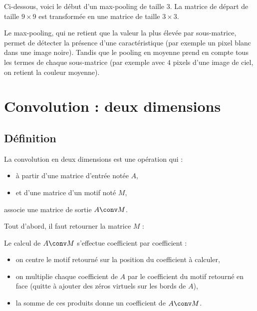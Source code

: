 \documentclass[11pt,class=report,crop=false]{standalone}
\begin{document}
Ci-dessous, voici le début d'un max-pooling de taille $3$. La matrice de départ de taille $9\times 9$ est transformée en une matrice de taille $3\times 3$.
  
  

Le max-pooling, qui ne retient que la valeur la plus élevée par sous-matrice, permet de détecter la présence d'une caractéristique (par exemple un pixel blanc dans une image noire). Tandis que le pooling en moyenne prend en compte tous les termes de chaque sous-matrice (par exemple avec $4$ pixels d'une image de ciel, on retient la couleur moyenne). 




\section{Convolution : deux dimensions}

\subsection{Définition}

La convolution en deux dimensions est une opération qui :
\begin{itemize}
  \item à partir d'une matrice d'entrée notée $A$,
  \item et d'une matrice d'un motif noté $M$,
\end{itemize}
associe une matrice de sortie $A \conv M$.

Tout d'abord, il faut retourner la matrice $M$ : 



Le calcul de  $A \conv M$ s'effectue coefficient par coefficient :
\begin{itemize}
  \item on centre le motif retourné sur la position du coefficient à calculer,
  \item on multiplie chaque coefficient de $A$ par le coefficient du motif retourné en face (quitte à ajouter des zéros virtuels sur les bords de $A$),
  \item la somme de ces produits donne un coefficient de $A \conv M$.
\end{itemize}
\end{document}
